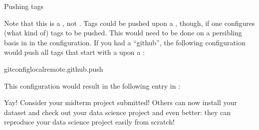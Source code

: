 \ignorespaces \begin{gitusernote}[label={index-18}, before title={\thetcbcounter\ }, check odd page=true]{Pushing tags}
\label{\detokenize{basics/101-130-yodaproject:index-18}}

\sphinxAtStartPar
Note that this is a , not .
Tags could be pushed upon a , though, if one
configures (what kind of) tags to be pushed. This would need to be done
on a per\sphinxhyphen{}sibling basis in  in the 
configuration. If you had a {\hyperref[\detokenize{glossary:term-sibling}]{}} “github”, the following
configuration would push all tags that start with a  upon a
:

\begin{sphinxVerbatim}[commandchars=\\\{\}]
gitconfig\PYGZhy{}\PYGZhy{}localremote.github.push
\end{sphinxVerbatim}

\sphinxAtStartPar
This configuration would result in the following entry in :

\begin{sphinxVerbatim}[commandchars=\\\{\}]
\end{sphinxVerbatim}


\end{gitusernote}

\sphinxAtStartPar
Yay! Consider your midterm project submitted! Others can now install your
dataset and check out your data science project \textendash{} and even better: they can
reproduce your data science project easily from scratch!

